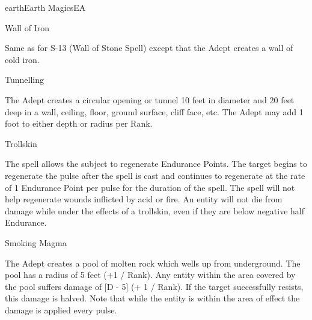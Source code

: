 \begin{College}[1.2]{earth}{Earth Magics}{EA}
\begin{spell}[S-14]{Wall of Iron}

\begin{effects}
Same as for S-13 (Wall of Stone Spell) except that the Adept creates a
wall of cold iron.
\end{effects}
\end{spell}

\begin{spell}[S-15]{Tunnelling}

\begin{effects}
The Adept creates a circular opening or tunnel 10 feet in diameter and
20 feet deep in a wall, ceiling, floor, ground surface, cliff face,
etc.  The Adept may add 1 foot to either depth or radius per Rank.
\end{effects}
\end{spell}

\begin{spell}[S-16]{Trollskin}

\begin{effects}
The spell allows the subject to regenerate Endurance Points.  The
target begins to regenerate the pulse after the spell is cast and
continues to regenerate at the rate of 1 Endurance Point per pulse for
the duration of the spell.  The spell will not help regenerate wounds
inflicted by acid or fire.  An entity will not die from damage while
under the effects of a trollskin, even if they are below negative half
Endurance.
\end{effects}
\end{spell}

\begin{spell}[S-17]{Smoking Magma}

\begin{effects}
The Adept creates a pool of molten rock which wells up from
underground.  The pool has a radius of 5 feet (+1 / Rank).  Any entity
within the area covered by the pool suffers damage of [D - 5] (+ 1 /
Rank).  If the target successfully resists, this damage is halved.
Note that while the entity is within the area of effect the damage is
applied every pulse.
\end{effects}
\end{spell}


\end{College}
